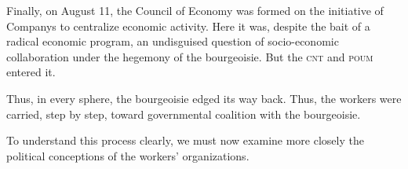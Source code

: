 Finally, on August 11, the Council of Economy was formed on the initiative of Companys to centralize economic activity. Here it was, despite the bait of a radical economic program, an undisguised question of socio-economic collaboration under the hegemony of the bourgeoisie. But the \textsc{cnt} and \textsc{poum} entered it.

Thus, in every sphere, the bourgeoisie edged its way back. Thus, the workers were carried, step by step, toward governmental coalition with the bourgeoisie.

To understand this process clearly, we must now examine more closely the political conceptions of the workers’ organizations.
